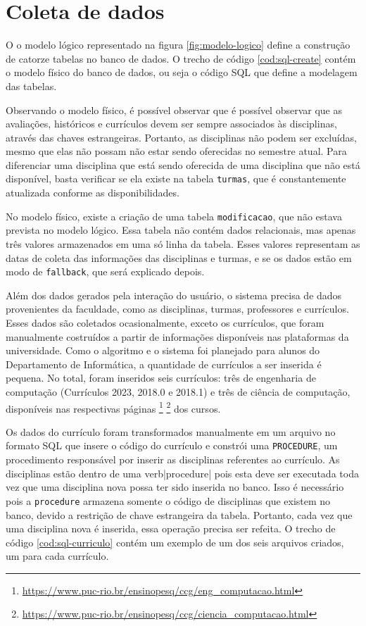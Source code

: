 \section{Coleta de dados}
\label{sec:Coleta de dados}

O o modelo lógico representado na figura \ref{fig:modelo-logico} define a construção de catorze tabelas no banco de dados. O trecho de código \ref{cod:sql-create} contém o modelo físico do banco de dados, ou seja o código SQL que define a modelagem das tabelas.



Observando o modelo físico, é possível observar que é possível observar que as avaliações, históricos e currículos devem ser sempre associados às disciplinas, através das chaves estrangeiras. Portanto, as disciplinas não podem ser excluídas, mesmo que elas não possam não estar sendo oferecidas no semestre atual. Para diferenciar uma disciplina que está sendo oferecida de uma disciplina que não está disponível, basta verificar se ela existe na tabela \verb|turmas|, que é constantemente atualizada conforme as disponibilidades.

No modelo físico, existe a criação de uma tabela \verb|modificacao|, que não estava prevista no modelo lógico. Essa tabela não contém dados relacionais, mas apenas três valores armazenados em uma só linha da tabela. Esses valores representam as datas de coleta das informações das disciplinas e turmas, e se os dados estão em modo de \verb|fallback|, que será explicado depois.

Além dos dados gerados pela interação do usuário, o sistema precisa de dados provenientes da faculdade, como as disciplinas, turmas, professores e currículos. Esses dados são coletados ocasionalmente, exceto os currículos, que foram manualmente costruídos a partir de informações disponíveis nas plataformas da universidade. Como o algoritmo e o sistema foi planejado para alunos do Departamento de Informática, a quantidade de currículos a ser inserida é pequena. No total, foram inseridos seis currículos: três de engenharia de computação (Currículos 2023, 2018.0 e 2018.1) e três de ciência de computação, disponíveis nas respectivas páginas
\footnote{\url{https://www.puc-rio.br/ensinopesq/ccg/eng_computacao.html}}
\footnote{\url{https://www.puc-rio.br/ensinopesq/ccg/ciencia_computacao.html}}
dos cursos.

Os dados do currículo foram transformados manualmente em um arquivo no formato SQL que insere o código do currículo e constrói uma \verb|PROCEDURE|, um procedimento responsável por inserir as disciplinas referentes ao currículo. As disciplinas estão dentro de uma verb|procedure| pois esta deve ser executada toda vez que uma disciplina nova possa ter sido inserida no banco. Isso é necessário pois a \verb|procedure| armazena somente o código de disciplinas que existem no banco, devido a restrição de chave estrangeira da tabela. Portanto, cada vez que uma disciplina nova é inserida, essa operação precisa ser refeita. O trecho de código \ref{cod:sql-curriculo} contém um exemplo de um dos seis arquivos criados, um para cada currículo.

